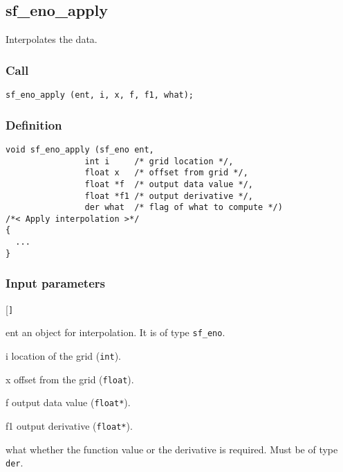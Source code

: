 \subsection{{sf\_eno\_apply}}
Interpolates the data.

\subsubsection*{Call}
\begin{verbatim}sf_eno_apply (ent, i, x, f, f1, what);\end{verbatim}

\subsubsection*{Definition}
\begin{verbatim}
void sf_eno_apply (sf_eno ent, 
                int i     /* grid location */, 
                float x   /* offset from grid */, 
                float *f  /* output data value */, 
                float *f1 /* output derivative */, 
                der what  /* flag of what to compute */) 
/*< Apply interpolation >*/
{
  ...
}
\end{verbatim}

\subsubsection*{Input parameters}
\begin{desclist}{\tt }{\quad}[\tt ]
   \setlength\itemsep{0pt}
   \item[ent]  an object for interpolation. It is of type \texttt{sf\_eno}.
   \item[i]    location of the grid (\texttt{int}).
   \item[x]    offset from the grid (\texttt{float}).  
   \item[f]    output data value (\texttt{float*}).  
   \item[f1]   output derivative (\texttt{float*}).  
   \item[what] whether the function value or the derivative is required. Must be of type \texttt{der}.  
\end{desclist}

